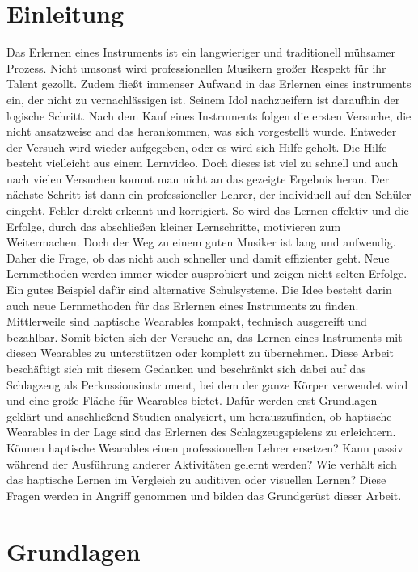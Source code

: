 \documentclass[ngerman,runningheads,a4paper]{llncs}
\begin{document}
\section{Einleitung}
Das Erlernen eines Instruments ist ein langwieriger und traditionell mühsamer Prozess.
Nicht umsonst wird professionellen Musikern großer Respekt für ihr Talent gezollt.
Zudem fließt immenser Aufwand in das Erlernen eines instruments ein, der nicht zu vernachlässigen ist.
Seinem Idol nachzueifern ist daraufhin der logische Schritt.
Nach dem Kauf eines Instruments folgen die ersten Versuche, die nicht ansatzweise and das herankommen, was sich vorgestellt wurde.
Entweder der Versuch wird wieder aufgegeben, oder es wird sich Hilfe geholt.
Die Hilfe besteht vielleicht aus einem Lernvideo.
Doch dieses ist viel zu schnell und auch nach vielen Versuchen kommt man nicht an das gezeigte Ergebnis heran.
Der nächste Schritt ist dann ein professioneller Lehrer, der individuell auf den Schüler eingeht, Fehler direkt erkennt und korrigiert.
So wird das Lernen effektiv und die Erfolge, durch das abschließen kleiner Lernschritte, motivieren zum Weitermachen.
Doch der Weg zu einem guten Musiker ist lang und aufwendig.
Daher die Frage, ob das nicht auch schneller und damit effizienter geht.
Neue Lernmethoden werden immer wieder ausprobiert und zeigen nicht selten Erfolge.
Ein gutes Beispiel dafür sind alternative Schulsysteme.
Die Idee besteht darin auch neue Lernmethoden für das Erlernen eines Instruments zu finden.
Mittlerweile sind haptische Wearables kompakt, technisch ausgereift und bezahlbar.
Somit bieten sich der Versuche an, das Lernen eines Instruments mit diesen Wearables zu unterstützen oder komplett zu übernehmen.
Diese Arbeit beschäftigt sich mit diesem Gedanken und beschränkt sich dabei auf das Schlagzeug als Perkussionsinstrument, bei dem der ganze Körper verwendet wird und eine große Fläche für Wearables bietet.
Dafür werden erst Grundlagen geklärt und anschließend Studien analysiert, um herauszufinden, ob haptische Wearables in der Lage sind das Erlernen des Schlagzeugspielens zu erleichtern.
Können haptische Wearables einen professionellen Lehrer ersetzen?
Kann passiv während der Ausführung anderer Aktivitäten gelernt werden?
Wie verhält sich das haptische Lernen im Vergleich zu auditiven oder visuellen Lernen?
Diese Fragen werden in Angriff genommen und bilden das Grundgerüst dieser Arbeit.



\section{Grundlagen}
\end{document}
